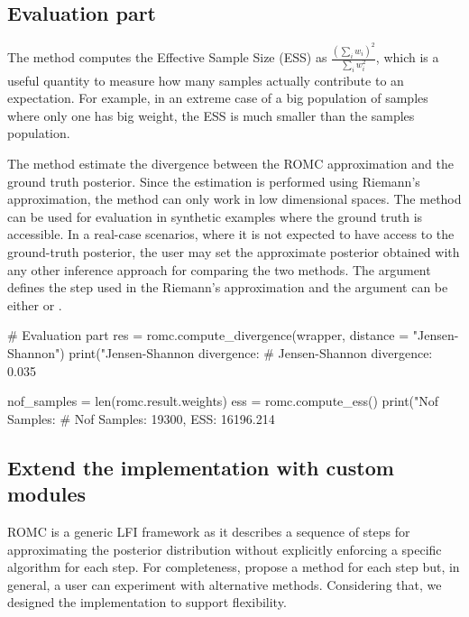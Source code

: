 \documentclass[nojss]{jss}
\begin{document}
\subsection{Evaluation part}
\label{subsec:evaluation}

The method  computes the Effective Sample
Size (ESS) as \(\frac{(\sum_i w_i)^2}{\sum_i w_i^2}\), which is a
useful quantity to measure how many samples actually contribute to an
expectation. For example, in an extreme case of a big population of
samples where only one has big weight, the ESS is much smaller than
the samples population.

\noindent
The method  estimate the divergence between the ROMC approximation
and the ground truth posterior. Since the estimation is performed
using Riemann's approximation, the method can only work in low
dimensional spaces. The method can be used for evaluation in synthetic
examples where the ground truth is accessible. In a real-case
scenarios, where it is not expected to have access to the ground-truth
posterior, the user may set the approximate posterior obtained with
any other inference approach for comparing the two methods. The
argument  defines the step used in the Riemann's
approximation and the argument  can be either
 or .

\begin{Code}
# Evaluation part
res = romc.compute_divergence(wrapper, distance = "Jensen-Shannon")
print("Jensen-Shannon divergence: %
# Jensen-Shannon divergence: 0.035

nof_samples = len(romc.result.weights)
ess = romc.compute_ess()
print("Nof Samples: %
# Nof Samples: 19300, ESS: 16196.214
\end{Code}


\subsection{Extend the implementation with custom modules}
\label{subsec:extensibility}

ROMC is a generic LFI framework as it describes a sequence of steps
for approximating the posterior distribution without explicitly
enforcing a specific algorithm for each step. For completeness,
\cite{Ikonomov2019} propose a method for each step but, in general, a
user can experiment with alternative methods. Considering that, we
designed the implementation to support flexibility.
\end{document}
